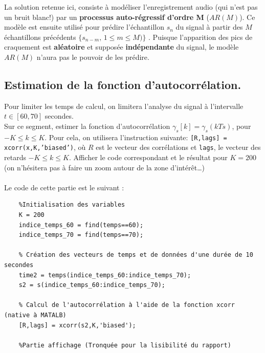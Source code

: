 \documentclass{article}
\begin{document}
\vspace*{3mm}
La solution retenue ici, consiste à modéliser l'enregistrement audio (qui n'est pas un bruit blanc!) par un \textbf{processus auto-régressif d'ordre M }($AR(M)$). Ce modèle est ensuite utilisé pour prédire l'échantillon  $s_n$ du signal à partir des $M$ échantillons précédents $\{s_{n-m},\,1 \leq m \leq M)\}$ . Puisque l'apparition des pics de craquement est \textbf{aléatoire} et supposée \textbf{indépendante} du signal, le modèle $AR(M)$ n'aura pas le pouvoir de  les prédire.

\newpage
\subsection{Estimation de la fonction d'autocorrélation.}

Pour limiter les temps de calcul, on limitera l'analyse du signal à l'intervalle $t\in[60,70]$ secondes. \\
Sur ce segment, estimer la fonction d'autocorrélation $\gamma_s[k] = \gamma_s(kTs)$, 
pour $-K\leq k \leq K$. Pour cela, on utilisera l'instruction suivante:  {\tt [R,lags] = xcorr(x,K,'biased')}, où $R$ est le vecteur des corrélations et {\tt lags}, le vecteur des retards $-K\leq k \leq K$. Afficher le code correspondant et le résultat pour $K=200$ (on n'hésitera pas à faire un zoom autour de la zone d'intérêt\ldots) \\ \\
Le code de cette partie est le suivant :  
\begin{verbatim}
    %Initialisation des variables
    K = 200
    indice_temps_60 = find(temps==60);
    indice_temps_70 = find(temps==70);
    
    % Création des vecteurs de temps et de données d'une durée de 10 secondes
    time2 = temps(indice_temps_60:indice_temps_70);
    s2 = s(indice_temps_60:indice_temps_70);
    
    % Calcul de l'autocorrélation à l'aide de la fonction xcorr (native à MATALB)
    [R,lags] = xcorr(s2,K,'biased');
    
    %Partie affichage (Tronquée pour la lisibilité du rapport) 
\end{verbatim}
\end{document}
